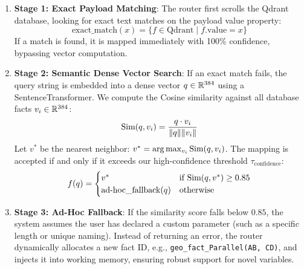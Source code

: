 \begin{enumerate}
    \item \textbf{Stage 1: Exact Payload Matching}:
        The router first scrolls the Qdrant database, looking for exact text matches on the payload value property:
        \begin{equation}
            \text{exact\_match}(x) = \{ f \in \text{Qdrant} \mid f.\text{value} = x \}
        \end{equation}
        If a match is found, it is mapped immediately with 100\% confidence, bypassing vector computation.
    \item \textbf{Stage 2: Semantic Dense Vector Search}:
        If an exact match fails, the query string is embedded into a dense vector $q \in \mathbb{R}^{384}$ using a SentenceTransformer. We compute the Cosine similarity against all database facts $v_i \in \mathbb{R}^{384}$:
        \begin{equation}
            \text{Sim}(q, v_i) = \frac{q \cdot v_i}{\|q\| \|v_i\|}
        \end{equation}
        Let $v^*$ be the nearest neighbor: $v^* = \arg\max_{v_i} \text{Sim}(q, v_i)$. 
        The mapping is accepted if and only if it exceeds our high-confidence threshold $\tau_{\text{confidence}}$:
        \begin{equation}
            f(q) = \begin{cases} 
                v^* & \text{if } \text{Sim}(q, v^*) \ge 0.85 \\
                \text{ad-hoc\_fallback}(q) & \text{otherwise}
            \end{cases}
        \end{equation}
    \item \textbf{Stage 3: Ad-Hoc Fallback}:
        If the similarity score falls below $0.85$, the system assumes the user has declared a custom parameter (such as a specific length or unique naming). Instead of returning an error, the router dynamically allocates a new fact ID, e.g., \texttt{geo\_fact\_Parallel(AB, CD)}, and injects it into working memory, ensuring robust support for novel variables.
\end{enumerate}
